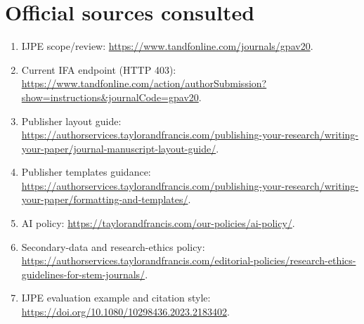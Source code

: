 \documentclass[11pt]{article}
\begin{document}
\section*{Official sources consulted}
\begin{enumerate}
\item IJPE scope/review: \url{https://www.tandfonline.com/journals/gpav20}.
\item Current IFA endpoint (HTTP 403): \url{https://www.tandfonline.com/action/authorSubmission?show=instructions&journalCode=gpav20}.
\item Publisher layout guide: \url{https://authorservices.taylorandfrancis.com/publishing-your-research/writing-your-paper/journal-manuscript-layout-guide/}.
\item Publisher templates guidance: \url{https://authorservices.taylorandfrancis.com/publishing-your-research/writing-your-paper/formatting-and-templates/}.
\item AI policy: \url{https://taylorandfrancis.com/our-policies/ai-policy/}.
\item Secondary-data and research-ethics policy: \url{https://authorservices.taylorandfrancis.com/editorial-policies/research-ethics-guidelines-for-stem-journals/}.
\item IJPE evaluation example and citation style: \url{https://doi.org/10.1080/10298436.2023.2183402}.
\end{enumerate}
\end{document}
